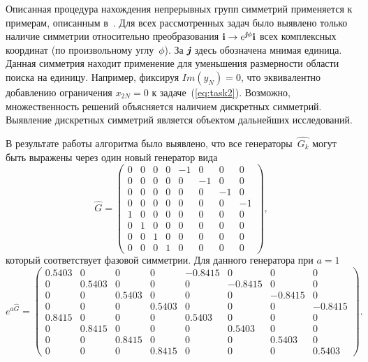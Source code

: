 \documentclass{llncs}
\begin{document}
Описанная процедура нахождения непрерывных групп симметрий применяется к примерам, описанным в~\cite{tyunin:daor}. Для всех рассмотренных задач было выявлено только наличие симметрии относительно преобразования $\textbf{i} \to e^{\emph{\textbf{j}}\phi}\textbf{i}$ всех комплексных координат (по произвольному углу~$\phi$). За $\emph{\textbf{j}}$ здесь обозначена мнимая единица. Данная симметрия находит применение для уменьшения размерности области поиска на единицу. Например, фиксируя $Im(y_{N})=0$, что эквивалентно добавлению ограничения $x_{2N}=0$ к задаче~(\ref{eq:task2}). Возможно, множественность решений объясняется наличием дискретных симметрий. Выявление дискретных симметрий является объектом дальнейших исследований.

В результате работы алгоритма было выявлено, что все генераторы~$\hat{G_k}$ могут быть выражены через один новый генератор вида
$$
\hat{G} = \left(\begin{array}{cccccccc}
        0 & 0 & 0 & 0 & -1 & 0 & 0 & 0\\
        0 & 0 & 0 & 0 & 0 & -1 & 0 & 0\\
        0 & 0 & 0 & 0 & 0 & 0 & -1 & 0\\
        0 & 0 & 0 & 0 & 0 & 0 & 0 & -1\\
        1 & 0 & 0 & 0 & 0 & 0 & 0 & 0\\
        0 & 1 & 0 & 0 & 0 & 0 & 0 & 0\\
        0 & 0 & 1 & 0 & 0 & 0 & 0 & 0\\
        0 & 0 & 0 & 1 & 0 & 0 & 0 & 0
\end{array}\right),
$$
который соответствует фазовой симметрии. Для данного генератора при $a = 1$
$$e^{a\hat{G}} = \left(\begin{array}{cccccccc}
        0.5403 & 0 & 0 & 0 & -0.8415 & 0 & 0 & 0\\
        0 & 0.5403 & 0 & 0 & 0 & -0.8415 & 0 & 0\\
        0 & 0 & 0.5403 & 0 & 0 & 0 & -0.8415 & 0\\
        0 & 0 & 0 & 0.5403 & 0 & 0 & 0 & -0.8415\\
        0.8415 & 0 & 0 & 0 & 0.5403 & 0 & 0 & 0\\
        0 & 0.8415 & 0 & 0 & 0 & 0.5403 & 0 & 0\\
        0 & 0 & 0.8415 & 0 & 0 & 0 & 0.5403 & 0\\
        0 & 0 & 0 & 0.8415 & 0 & 0 & 0 & 0.5403
\end{array}\right).
$$


\end{document}
